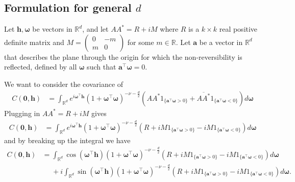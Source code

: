 \documentclass[11pt]{article}
\newcommand{\vlen}{\boldsymbol{h}}
\newcommand{\vint}{\boldsymbol{\omega}}
\newcommand{\vpla}{\boldsymbol{a}}
\begin{document}
\subsection{Formulation for general $d$}

Let $ \vlen, \vint$ be vectors in $\mathbb{R}^d$, and let $AA^* = R + iM$ where $R$ is a $k\times k$ real positive definite matrix and $M = \begin{pmatrix} 0 & -m\\  m & 0\end{pmatrix}$ for some $m \in \mathbb{R}$. Let $\vpla$ be a vector in $\mathbb{R}^d$ that describes the plane through the origin for which the non-reversibility is reflected, defined by all $\vint$ such that $\vpla^\top \vint = 0$.

We want to consider the covariance of \begin{align*}
C(\boldsymbol{0}, \boldsymbol{h}) &= \int_{\mathbb{R}^d} e^{i \vint^\top \vlen} (1 +\vint^\top \vint )^{-\nu- \frac{d}{2}} \left(AA^* 1_{\{\vpla^\top \vint > 0\}} + \overline{AA^*} 1_{\{\vpla^\top\vint < 0\}}\right) d\vint%
\end{align*}
Plugging in $AA^* = R + iM$ gives
\begin{align*}
C(\boldsymbol{0}, \boldsymbol{h})&=\int_{\mathbb{R}^d} e^{i \vint^\top \boldsymbol{h}}(1 + \vint^\top \vint)^{-\nu- \frac{d}{2}} \left(R + iM1_{\{\vpla^\top\vint > 0\}}  - iM1_{\{\vpla^\top\vint < 0\}}\right) d\vint\end{align*}
and by breaking up the integral we have
\begin{align*}
C(\boldsymbol{0}, \boldsymbol{h})%
&=\int_{\mathbb{R}^d}\cos(\vint^\top \boldsymbol{h})(1 + \vint^\top \vint)^{-\nu- \frac{d}{2}} \left(R + iM1_{\{\vpla^\top\vint > 0\}}  - iM1_{\{\vpla^\top\vint < 0\}}\right) d\vint \\
&\ \ \ \ \ \ +i\int_{\mathbb{R}^d}\sin(\vint^\top \boldsymbol{h})(1 + \vint^\top \vint)^{-\nu- \frac{d}{2}} \left(R + iM1_{\{\vpla^\top\vint > 0\}}  - iM1_{\{\vpla^\top\vint < 0\}}\right) d\vint.\end{align*}
\end{document}
